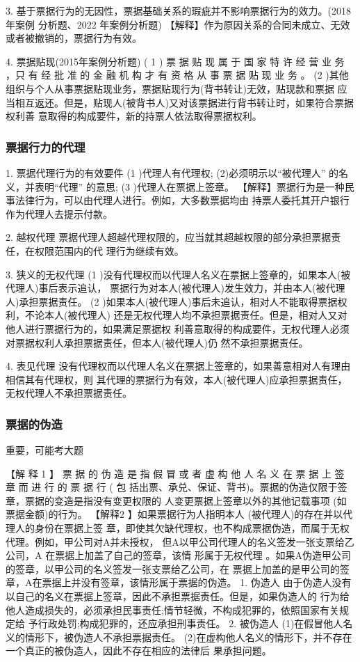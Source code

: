 \documentclass[UTF8,12pt]{ctexart}
\numberwithin{equation}{section} %
\numberwithin{figure}{section}
\numberwithin{table}{section}
\begin{document}
	3. 基于票据行为的无因性，票据基础关系的瑕疵并不影响票据行为的效力。(2018年案例 分析题、2022 年案例分析题)
	【解释】作为原因关系的合同未成立、无效或者被撤销的，票据行为有效。
	
	4. 票据贴现(2015年案例分析题)
	( 1 ) 票 据 贴 现 属 于 国 家 特 许 经 营 业 务 ，只 有 经 批 准 的 金 融 机 构 才 有 资 格 从 事 票 据 贴 现 业 务 。 (2 )其他组织与个人从事票据贴现业务，票据贴现行为(背书转让)无效，贴现款和票据 应当相互返还。但是，贴现人(被背书人)又对该票据进行背书转让时，如果符合票据权利善 意取得的构成要件，新的持票人依法取得票据权利。
	
	
	
	\subsubsection{票据行力的代理}
	
	1. 票据代理行为的有效要件
	(1 )代理人有代理权;
	(2)必须明示以“被代理人” 的名义，并表明“代理” 的意思; (3 )代理人在票据上签章。
	【解释】票据行为是一种民事法律行为，可以由代理人进行。例如，大多数票据均由 持票人委托其开户银行作为代理人去提示付款。
	
	2. 越权代理 票据代理人超越代理权限的，应当就其超越权限的部分承担票据责任，在权限范围内的代 理行为继续有效。
	
	
	3. 狭义的无权代理
	(1 )没有代理权而以代理人名义在票据上签章的，如果本人(被代理人)事后表示追认， 票据行为对本人(被代理人)发生效力，并由本人(被代理人)承担票据责任。
	(2 )如果本人(被代理人)事后未追认，相对人不能取得票据权利，不论本人(被代理人) 还是无权代理人均不承担票据责任。但是，相对人又对他人进行票据行为的，如果满足票据权 利善意取得的构成要件，无权代理人必须对票据权利人承担票据责任，但本人(被代理人)仍 然不承担票据责任。
	
	4. 表见代理 没有代理权而以代理人名义在票据上签章的，如果善意相对人有理由相信其有代理权，则 其代理的票据行为有效，本人(被代理人)应承担票据责任，无权代理人不承担票据责任。
	
	\subsubsection{票据的伪造}
	重要，可能考大题
	
	【解 释 1 】 票 据 的 伪 造 是 指 假 冒 或 者 虚 构 他 人 名 义 在 票 据 上 签 章 而 进 行 的 票 据 行 ( 包 括出票、承兑、保证、背书)。票据的伪造仅限于签章，票据的变造是指没有变更权限的 人变更票据上签章以外的其他记载事项 (如票据金额)的行为。
	【解释2 】如果票据行为人指明本人 (被代理人)的存在并以代理人的身份在票据上签 章，即使其欠缺代理权，也不构成票据伪造，而属于无权代理。例如，甲公司对A并未授权， 但A以甲公司代理人的名义签发一张支票给乙公司，A 在票据上加盖了自己的签章，该情 形属于无权代理 。如果A伪造甲公司的签章，以甲公司的名义签发一张支票给乙公司，在 票据上加盖的是甲公司的签章，A在票据上并没有签章，该情形属于票据的伪造。
	1. 伪造人 由于伪造人没有以自己的名义在票据上签章，因此不承担票据责任。但是，如果伪造人的 行为给他人造成损失的，必须承担民事责任;情节轻微，不构成犯罪的，依照国家有关规定给 予行政处罚;构成犯罪的，还应承担刑事责任。
	2. 被伪造人
	(1)在假冒他人名义的情形下，被伪造人不承担票据责任。 (2)在虚构他人名义的情形下，并不存在 一个真正的被伪造人，因此不存在相应的法律后 果承担问题。
	
\end{document}
